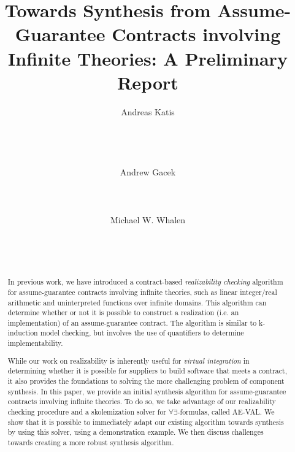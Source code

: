 \documentclass{sig-alternate-05-2015}
\begin{document}
\title{Towards Synthesis from Assume-Guarantee Contracts involving Infinite
Theories: A Preliminary Report}

\author{
\alignauthor
	Andreas Katis\\
	   \\
       \\
       \\
       \\
\alignauthor
	Andrew Gacek\\
       \\
       \\
       \\
\alignauthor
	Michael W. Whalen
	   \\
       \\
       \\
       \\
       }


\maketitle

\begin{abstract}
In previous work, we have introduced a contract-based {\em realizability checking} 
algorithm for assume-guarantee contracts involving infinite theories, such as 
linear integer/real arithmetic and uninterpreted functions over infinite domains.  
This algorithm can determine whether or not it is possible to construct a 
realization (i.e. an implementation) of an assume-guarantee contract.  
The algorithm is similar to k-induction model checking, but involves the use of 
quantifiers to determine implementability.

While our work on realizability is inherently useful for {\em virtual integration} 
in determining whether it is possible for suppliers to build software that meets 
a contract, it also provides the foundations to solving the more challenging problem 
of component synthesis. In this paper, we provide an initial synthesis 
algorithm for assume-guarantee contracts involving 
infinite theories.  To do so, we take advantage of our realizability checking 
procedure and a skolemization solver for $\forall\exists$-formulas, called
AE-VAL.  We show that it is possible to immediately
adapt our existing algorithm towards synthesis by using this solver, using a demonstration example.  We then discuss challenges towards creating a more robust synthesis algorithm.

\end{abstract}
\end{document}
